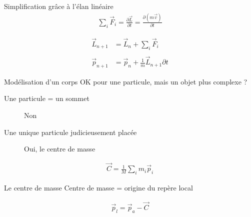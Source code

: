 \documentclass{beamer}
\newcommand{\deriv}{\partial \!}
\begin{document}
\begin{frame}{Simplification grâce à l'élan linéaire}
  \begin{align*}
    \sum_i \vec{F}_i = \frac{\deriv \vec{L}}{\deriv t} = \frac{\deriv (m\vec{v})}{\deriv t}
  \end{align*}

  \begin{align*}
    \vec{L}_{n+1} &= \vec{L}_n + {\sum_i \vec{F}_i} \\ \\
    \vec{p}_{n+1} &= \vec{p}_n + \frac{1}{m}\vec{L}_{n+1} \deriv t
  \end{align*}
\end{frame}

\begin{frame}{Modélisation d'un corps}
  OK pour une particule, mais un objet plus complexe ?
  \begin{description}
    \item[Une particule = un sommet] Non
    \item[Une unique particule judicieusement placée] Oui, le centre de masse
  \end{description}

  \vfill

  \begin{align*}
    \vec{C} = \frac{1}{M} \sum_i m_i \vec{p}_i
  \end{align*}
\end{frame}

\begin{frame}{Le centre de masse}
  Centre de masse = origine du repère local

  \vfill

  \begin{figure}
    
  \end{figure}

  \vfill

  \begin{align*}
    \vec{p}_l = \vec{p}_a - \vec{C}
  \end{align*}
\end{frame}
\end{document}
